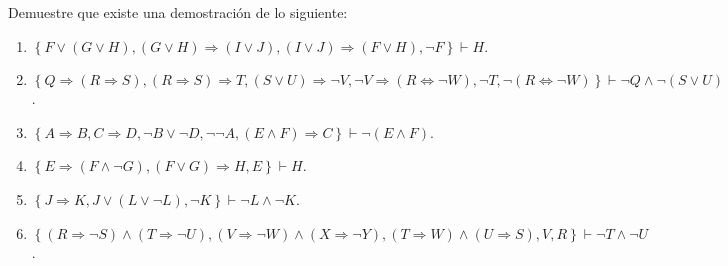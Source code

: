 \documentclass[12pt]{report}
\theoremstyle{largebreak}
\begin{document}
    \begin{excer}
        Demuestre que existe una demostración de lo siguiente:
        \begin{enumerate}
            \item $\left\{F\lor(G\lor H),(G\lor H)\Rightarrow(I\lor J),(I\lor J)\Rightarrow(F\lor H),\neg F \right\}\vdash H$.
            \item $\left\{Q\Rightarrow(R\Rightarrow S), (R\Rightarrow S)\Rightarrow T, (S\lor U)\Rightarrow \neg V,\neg V\Rightarrow(R\iff \neg W),\neg T,\neg(R\iff \neg W) \right\}\vdash \neg Q\land\neg(S\lor U)$.
            \item $\left\{A\Rightarrow B, C\Rightarrow D, \neg B\lor\neg D,\neg\neg A, (E\land F)\Rightarrow C \right\}\vdash \neg(E\land F)$.
            \item $\left\{E\Rightarrow (F\land \neg G),(F\lor G)\Rightarrow H, E \right\}\vdash H$.
            \item $\left\{J\Rightarrow K, J\lor(L\lor\neg L),\neg K \right\}\vdash\neg L\land \neg K$.
            \item $\left\{(R\Rightarrow\neg S)\land(T\Rightarrow\neg U),(V\Rightarrow\neg W)\land(X\Rightarrow\neg Y),(T\Rightarrow W)\land(U\Rightarrow S), V, R \right\}\vdash \neg T\land\neg U$.
        \end{enumerate}
    \end{excer}
\end{document}
